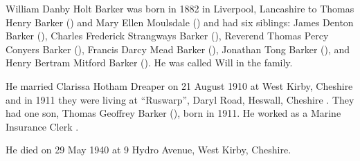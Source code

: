 
William Danby Holt Barker was born in 1882 in Liverpool, Lancashire to Thomas Henry Barker () and Mary Ellen Moulsdale () \cite{WDHBarkerBirth} and had six siblings: James Denton Barker (),  Charles Frederick Strangways Barker (), Reverend Thomas Percy Conyers Barker (), Francis Darcy Mead Barker (), Jonathan Tong Barker (), and Henry Bertram Mitford Barker (). He was called Will in the family.

He married Clarissa Hotham Dreaper {} on 21 August 1910 at West Kirby, Cheshire\cite{CheshireParishRegisters} and in 1911 they were living at ``Ruswarp'', Daryl Road, Heswall, Cheshire \cite{WDHBarker1911}.  They had one son, Thomas Geoffrey Barker (), born in 1911.  He worked as a Marine Insurance Clerk \cite{WDHBarker1911}.

He died on 29 May 1940 at 9 Hydro Avenue, West Kirby, Cheshire.
